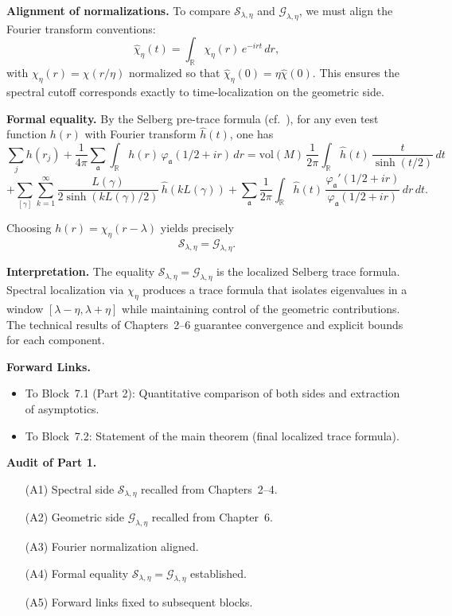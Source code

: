 \medskip

\noindent\textbf{Alignment of normalizations.}
To compare $\mathcal{S}_{\lambda,\eta}$ and $\mathcal{G}_{\lambda,\eta}$, we must align the Fourier transform conventions:
\[
  \widehat{\chi}_\eta(t) = \int_{\mathbb{R}} \chi_\eta(r)\, e^{-irt}\, dr,
\]
with $\chi_\eta(r) = \chi(r/\eta)$ normalized so that $\widehat{\chi}_\eta(0) = \eta \widehat{\chi}(0)$.  
This ensures the spectral cutoff corresponds exactly to time-localization on the geometric side.

\medskip

\noindent\textbf{Formal equality.}
By the Selberg pre-trace formula (cf.~\cite{Selberg1956, Hejhal1983}), for any even test function $h(r)$ with Fourier transform $\widehat{h}(t)$, one has
\[
  \sum_j h(r_j) + \frac{1}{4\pi}\sum_{\mathfrak{a}} \int_{\mathbb{R}} h(r)\,\varphi_\mathfrak{a}(1/2+ir)\, dr
  = \mathrm{vol}(M)\,\frac{1}{2\pi}\int_{\mathbb{R}} \widehat{h}(t)\,\frac{t}{\sinh(t/2)}\, dt
\]
\[
  + \sum_{[\gamma]} \sum_{k=1}^\infty
    \frac{L(\gamma)}{2\sinh(kL(\gamma)/2)}\, \widehat{h}(kL(\gamma))
  + \sum_{\mathfrak{a}} \frac{1}{2\pi}\int_{\mathbb{R}}
    \widehat{h}(t)\, \frac{\varphi_\mathfrak{a}'(1/2+ir)}{\varphi_\mathfrak{a}(1/2+ir)}\, dr\, dt.
\]

Choosing $h(r) = \chi_\eta(r-\lambda)$ yields precisely
\[
  \mathcal{S}_{\lambda,\eta} = \mathcal{G}_{\lambda,\eta}.
\]

\medskip

\noindent\textbf{Interpretation.}
The equality $\mathcal{S}_{\lambda,\eta} = \mathcal{G}_{\lambda,\eta}$ is the localized Selberg trace formula.  
Spectral localization via $\chi_\eta$ produces a trace formula that isolates eigenvalues in a window $[\lambda-\eta,\lambda+\eta]$ while maintaining control of the geometric contributions.  
The technical results of Chapters~2–6 guarantee convergence and explicit bounds for each component.

\medskip

\noindent\textbf{Forward Links.}
\begin{itemize}
  \item To Block~7.1 (Part 2): Quantitative comparison of both sides and extraction of asymptotics.
  \item To Block~7.2: Statement of the main theorem (final localized trace formula).
\end{itemize}

\medskip

\noindent\textbf{Audit of Part 1.}
\begin{itemize}
  \item[(A1)] Spectral side $\mathcal{S}_{\lambda,\eta}$ recalled from Chapters~2–4.
  \item[(A2)] Geometric side $\mathcal{G}_{\lambda,\eta}$ recalled from Chapter~6.
  \item[(A3)] Fourier normalization aligned.
  \item[(A4)] Formal equality $\mathcal{S}_{\lambda,\eta}=\mathcal{G}_{\lambda,\eta}$ established.
  \item[(A5)] Forward links fixed to subsequent blocks.
\end{itemize}

